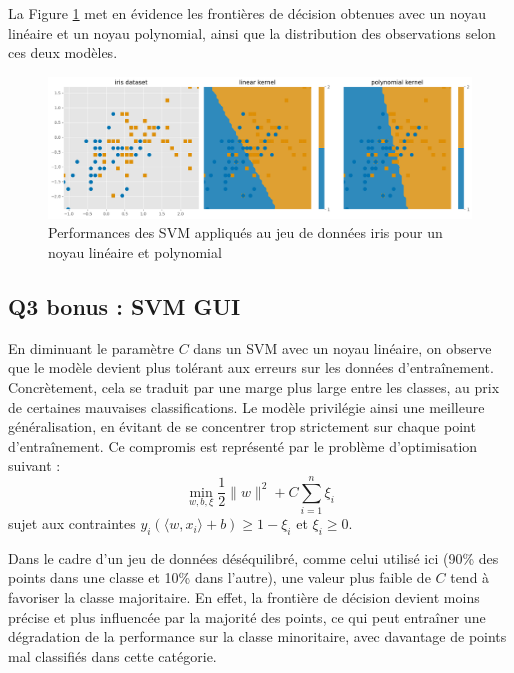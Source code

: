 \documentclass{scrartcl}
\begin{document}
La Figure \ref{fig:noyaux} met en évidence les frontières de décision obtenues avec un noyau linéaire et un noyau polynomial, ainsi que la distribution des observations selon ces deux modèles.\newline

\begin{figure}[H]
    \centering
    \includegraphics[width=1\textwidth]{../images/iris.png}
    \caption{\centering Performances des SVM appliqués au jeu de données iris pour un noyau linéaire et polynomial} 
    \label{fig:noyaux}
\end{figure}


\subsection{Q3 bonus : SVM GUI}

\hspace{7pt} En diminuant le paramètre $C$ dans un SVM avec un noyau linéaire, on observe que le modèle devient plus tolérant aux erreurs sur les données d'entraînement. Concrètement, cela se traduit par une marge plus large entre les classes, au prix de certaines mauvaises classifications. Le modèle privilégie ainsi une meilleure généralisation, en évitant de se concentrer trop strictement sur chaque point d'entraînement.  Ce compromis est représenté par le problème d'optimisation suivant :
\[
\min_{w, b, \xi} \frac{1}{2} \|w\|^2 + C \sum_{i=1}^{n} \xi_i
\]
sujet aux contraintes \(y_i (\langle w, x_i \rangle + b) \geq 1 - \xi_i\) et \(\xi_i \geq 0\).
\newline

Dans le cadre d'un jeu de données déséquilibré, comme celui utilisé ici (90\% des points dans une classe et 10\% dans l'autre), une valeur plus faible de $C$ tend à favoriser la classe majoritaire. En effet, la frontière de décision devient moins précise et plus influencée par la majorité des points, ce qui peut entraîner une dégradation de la performance sur la classe minoritaire, avec davantage de points mal classifiés dans cette catégorie.
\end{document}
